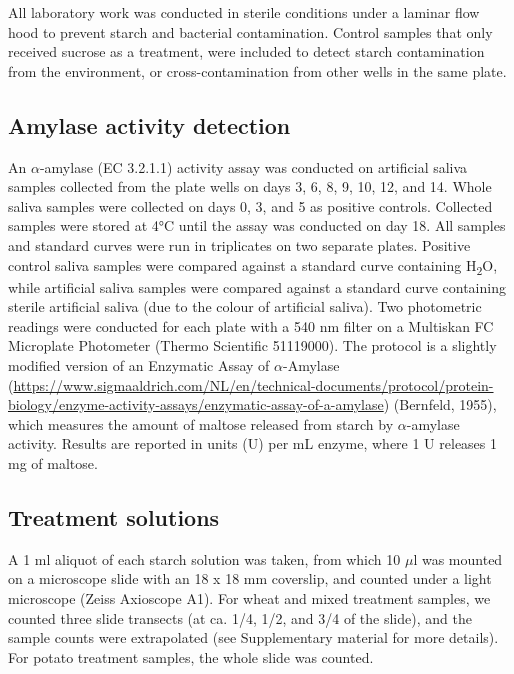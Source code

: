 \documentclass[
]{article}
\begin{document}
All laboratory work was conducted in sterile conditions under a laminar flow hood
to prevent starch and bacterial contamination. Control samples that only received
sucrose as a treatment, were included to detect starch contamination from the
environment, or cross-contamination from other wells in the same plate.

\hypertarget{amylase-activity-detection}{%
\subsection{Amylase activity detection}\label{amylase-activity-detection}}

An \(\alpha\)-amylase (EC 3.2.1.1) activity assay was conducted on artificial
saliva samples collected from the plate wells on days 3, 6, 8, 9, 10, 12, and 14.
Whole saliva samples were collected on days 0, 3, and 5 as positive controls.
Collected samples were stored at 4°C until the assay was conducted on day 18.
All samples and standard curves were run in triplicates on two separate plates.
Positive control saliva samples were compared against a standard curve containing
H\textsubscript{2}O, while artificial saliva samples were compared against a standard curve
containing sterile artificial saliva (due to the colour of artificial saliva).
Two photometric readings were conducted for each plate with a 540 nm filter on a
Multiskan FC Microplate Photometer (Thermo Scientific 51119000).
The protocol is a slightly modified version of an Enzymatic Assay of \(\alpha\)-Amylase
(\url{https://www.sigmaaldrich.com/NL/en/technical-documents/protocol/protein-biology/enzyme-activity-assays/enzymatic-assay-of-a-amylase}) (Bernfeld, 1955), which measures the amount of
maltose released from starch by \(\alpha\)-amylase activity. Results are reported
in units (U) per mL enzyme, where 1 U releases 1 mg of maltose.

\hypertarget{treatment-solutions}{%
\subsection{Treatment solutions}\label{treatment-solutions}}

A 1 ml aliquot of each starch solution was taken, from which 10 \(\mu\)l was mounted
on a microscope slide with an 18 x 18 mm coverslip, and counted under a light microscope
(Zeiss Axioscope A1). For wheat and mixed treatment samples, we counted three
slide transects (at ca. 1/4, 1/2, and 3/4 of the slide), and the sample counts
were extrapolated (see Supplementary material for more details). For potato
treatment samples, the whole slide was counted.
\end{document}
